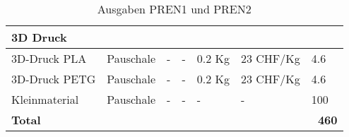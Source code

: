 \documentclass[main.tex]{subfiles} %
\begin{document}
\begin{table}[h]
{\begin{tabular}{|p{3cm}|p{2.5cm}|p{2.5cm}|p{3cm}|p{1cm}|p{1.5cm}|p{1cm}|}
            \rowcolor{lightgray} 3D Druck           &                    &                              &                         &                 &                           &                            \\ \hline
            3D-Druck PLA                            & Pauschale          & -                            & -                       & 0.2 Kg          & 23 CHF/Kg                 & 4.6                         \\ \hline
            3D-Druck PETG                           & Pauschale          & -                            & -                       & 0.2 Kg          & 23 CHF/Kg                 & 4.6                         \\ \hline
            \rowcolor{lightgray} Kleinmaterial      & Pauschale          & -                            & -                       & -               & -                         & 100                          \\ \hline

            \textbf{Total}                          &                    &                              &                         &                 &                           & \textbf{~460}                \\ \hline
        \end{tabular}
    }
    \caption{Ausgaben PREN1 und PREN2}
    \label{tab:Ausgaben_PREN}
\end{table}
\end{document}
